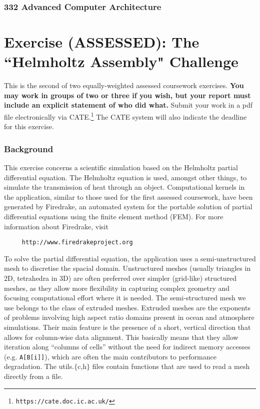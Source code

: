 \documentclass{article}
\begin{document}
         

\subsubsection*{332 Advanced Computer Architecture}

\section*{Exercise (ASSESSED): The ``Helmholtz Assembly" Challenge}

This is the second of two equally-weighted assessed coursework exercises. \textbf{You may work in groups of two or three if you wish, but your report must include an explicit statement of who did what.} Submit your work in a pdf file electronically via CATE.\footnote{{\tt https://cate.doc.ic.ac.uk/}} The CATE system will also indicate the deadline for this exercise.

\subsubsection*{Background}

This exercise concerns a scientific simulation based on the Helmholtz partial differential equation. The Helmholtz equation is used, amongst other things, to simulate the transmission of heat through an object. Computational kernels in the application, similar to those used for the first assessed coursework, have been generated by Firedrake, an automated system for the portable solution of partial differential equations using the finite element method (FEM). For more information about Firedrake, visit
\begin{verbatim}
     http://www.firedrakeproject.org
\end{verbatim}

To solve the partial differential equation, the application uses a semi-unstructured mesh to discretise the spacial domain. Unstructured meshes (usually triangles in 2D, tetrahedra in 3D) are often preferred over simpler (grid-like) structured meshes, as they allow more flexibility in capturing complex geometry and focusing computational effort where it is needed. The semi-structured mesh we use belongs to the class of extruded meshes. Extruded meshes are the exponents of problems involving high aspect ratio domains present in ocean and atmosphere simulations. Their main feature is the presence of a short, vertical direction that allows for column-wise data alignment. This basically means that they allow iteration along ``columns of cells'' without the need for indirect memory accesses (e.g. \texttt{A[B[i]]}), which are often the main contributors to performance degradation. The utils.$\lbrace$c,h$\rbrace$ files contain functions that are used to read a mesh directly from a file.
\end{document}
